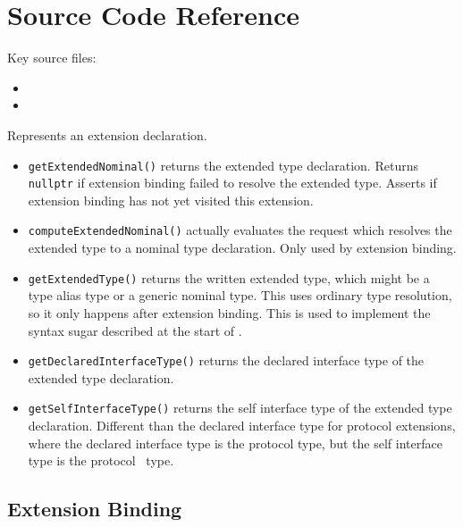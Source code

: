 \documentclass[../generics]{subfiles}
\begin{document}
\section{Source Code Reference}\label{extensionssourceref}

Key source files:
\begin{itemize}
\item {}
\item {}
\end{itemize}

Represents an extension declaration.
\begin{itemize}
\item \texttt{getExtendedNominal()} returns the extended type declaration. Returns \verb|nullptr| if extension binding failed to resolve the extended type. Asserts if extension binding has not yet visited this extension.
\item \texttt{computeExtendedNominal()} actually evaluates the request which resolves the extended type to a nominal type declaration. Only used by extension binding.
\item \texttt{getExtendedType()} returns the written extended type, which might be a type alias type or a generic nominal type. This uses ordinary type resolution, so it only happens after extension binding. This is used to implement the syntax sugar described at the start of .
\item \texttt{getDeclaredInterfaceType()} returns the declared interface type of the extended type declaration.
\item \texttt{getSelfInterfaceType()} returns the self interface type of the extended type declaration. Different than the declared interface type for protocol extensions, where the declared interface type is the protocol type, but the self interface type is the protocol \tSelf\ type.
\end{itemize}

\subsection*{Extension Binding}
\end{document}
